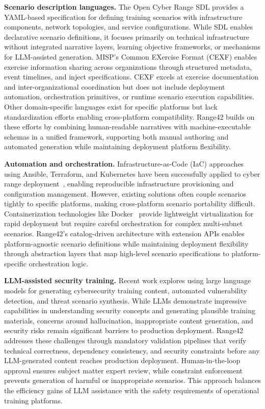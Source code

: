 \documentclass[11pt]{article}
\begin{document}
\textbf{Scenario description languages.}
The Open Cyber Range SDL provides a YAML-based specification for defining training scenarios with infrastructure components, network topologies, and service configurations. While SDL enables declarative scenario definitions, it focuses primarily on technical infrastructure without integrated narrative layers, learning objective frameworks, or mechanisms for LLM-assisted generation.
MISP's Common EXercise Format (CEXF) enables exercise information sharing across organizations through structured metadata, event timelines, and inject specifications. CEXF excels at exercise documentation and inter-organizational coordination but does not include deployment automation, orchestration primitives, or runtime scenario execution capabilities.
Other domain-specific languages exist for specific platforms but lack standardization efforts enabling cross-platform compatibility.
Range42 builds on these efforts by combining human-readable narratives with machine-executable schemas in a unified framework, supporting both manual authoring and automated generation while maintaining deployment platform flexibility.

\textbf{Automation and orchestration.}
Infrastructure-as-Code (IaC) approaches using Ansible, Terraform, and Kubernetes have been successfully applied to cyber range deployment~\cite{kypo2021}, enabling reproducible infrastructure provisioning and configuration management.
However, existing solutions often couple scenarios tightly to specific platforms, making cross-platform scenario portability difficult.
Containerization technologies like Docker~\cite{docker} provide lightweight virtualization for rapid deployment but require careful orchestration for complex multi-subnet scenarios.
Range42's catalog-driven architecture with extension APIs enables platform-agnostic scenario definitions while maintaining deployment flexibility through abstraction layers that map high-level scenario specifications to platform-specific orchestration logic.

\textbf{LLM-assisted security training.}
Recent work explores using large language models for generating cybersecurity training content, automated vulnerability detection, and threat scenario synthesis.
While LLMs demonstrate impressive capabilities in understanding security concepts and generating plausible training materials, concerns around hallucination, inappropriate content generation, and security risks remain significant barriers to production deployment.
Range42 addresses these challenges through mandatory validation pipelines that verify technical correctness, dependency consistency, and security constraints before any LLM-generated content reaches production deployment.
Human-in-the-loop approval ensures subject matter expert review, while constraint enforcement prevents generation of harmful or inappropriate scenarios.
This approach balances the efficiency gains of LLM assistance with the safety requirements of operational training platforms.
\end{document}
